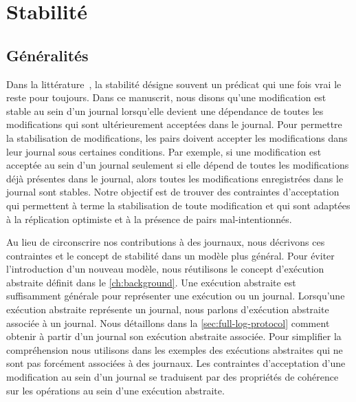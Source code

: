 \section{Stabilité}\label{sec:stability}

\subsection{Généralités}\label{subsec:general-stability}

Dans la littérature~\autocite{baquero_2018_pure-op-crdt, shapiro_2011_crdt,birman_1991_causalmulticast}, la stabilité désigne souvent un prédicat qui une fois vrai le reste pour toujours.
Dans ce manuscrit, nous disons qu'une modification est stable au sein d'un journal lorsqu'elle devient une dépendance de toutes les modifications qui sont ultérieurement acceptées dans le journal.
Pour permettre la stabilisation de modifications, les pairs doivent accepter les modifications dans leur journal sous certaines conditions.
Par exemple, si une modification est acceptée au sein d'un journal seulement si elle dépend de toutes les modifications déjà présentes dans le journal, alors toutes les modifications enregistrées dans le journal sont stables.
Notre objectif est de trouver des contraintes d'acceptation qui permettent à terme la stabilisation de toute modification et qui sont adaptées à la réplication optimiste et à la présence de pairs mal-intentionnés.

Au lieu de circonscrire nos contributions à des journaux, nous décrivons ces contraintes et le concept de stabilité dans un modèle plus général.
Pour éviter l'introduction d'un nouveau modèle, nous réutilisons le concept d'exécution abstraite définit dans le \autoref{ch:background}.
Une exécution abstraite est suffisamment générale pour représenter une exécution ou un journal.
Lorsqu'une exécution abstraite représente un journal, nous parlons d'exécution abstraite associée à un journal.
Nous détaillons dans la \autoref{sec:full-log-protocol} comment obtenir à partir d'un journal son exécution abstraite associée.
Pour simplifier la compréhension nous utilisons dans les exemples des exécutions abstraites qui ne sont pas forcément associées à des journaux.
Les contraintes d'acceptation d'une modification au sein d'un journal se traduisent par des propriétés de cohérence sur les opérations au sein d'une exécution abstraite.


